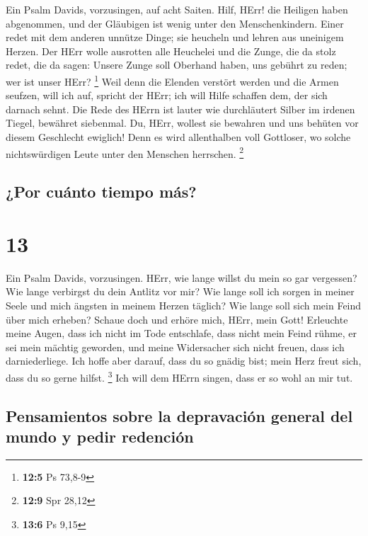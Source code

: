  Ein Psalm Davids, vorzusingen, auf acht Saiten.
 Hilf, HErr! die Heiligen haben abgenommen, und der
Gläubigen ist wenig unter den Menschenkindern.  Einer
redet mit dem anderen unnütze Dinge; sie heucheln und lehren aus
uneinigem Herzen.  Der HErr wolle ausrotten alle Heuchelei
und die Zunge, die da stolz redet,  die da sagen: Unsere
Zunge soll Oberhand haben, uns gebührt zu reden; wer ist unser HErr?
\footnote{\textbf{12:5} Ps 73,8-9}  Weil denn die Elenden
verstört werden und die Armen seufzen, will ich auf, spricht der HErr;
ich will Hilfe schaffen dem, der sich darnach sehnt.  Die
Rede des HErrn ist lauter wie durchläutert Silber im irdenen Tiegel,
bewähret siebenmal.  Du, HErr, wollest sie bewahren und
uns behüten vor diesem Geschlecht ewiglich!  Denn es wird
allenthalben voll Gottloser, wo solche nichtswürdigen Leute unter den
Menschen herrschen. \footnote{\textbf{12:9} Spr 28,12}

\hypertarget{por-cuuxe1nto-tiempo-muxe1s}{%
\subsection{¿Por cuánto tiempo más?}\label{por-cuuxe1nto-tiempo-muxe1s}}

\hypertarget{section-12}{%
\section{13}\label{section-12}}

 Ein Psalm Davids, vorzusingen.  HErr, wie
lange willst du mein so gar vergessen? Wie lange verbirgst du dein
Antlitz vor mir?  Wie lange soll ich sorgen in meiner
Seele und mich ängsten in meinem Herzen täglich? Wie lange soll sich
mein Feind über mich erheben?  Schaue doch und erhöre
mich, HErr, mein Gott! Erleuchte meine Augen, dass ich nicht im Tode
entschlafe,  dass nicht mein Feind rühme, er sei mein
mächtig geworden, und meine Widersacher sich nicht freuen, dass ich
darniederliege.  Ich hoffe aber darauf, dass du so gnädig
bist; mein Herz freut sich, dass du so gerne hilfst. \footnote{\textbf{13:6}
  Ps 9,15}  Ich will dem HErrn singen, dass er so wohl an
mir tut.

\hypertarget{pensamientos-sobre-la-depravaciuxf3n-general-del-mundo-y-pedir-redenciuxf3n}{%
\subsection{Pensamientos sobre la depravación general del mundo y pedir
redención}\label{pensamientos-sobre-la-depravaciuxf3n-general-del-mundo-y-pedir-redenciuxf3n}}

